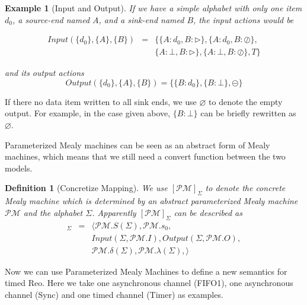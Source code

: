 \documentclass[conference, a4paper]{IEEEtran}
\newtheorem{definition}{Definition}
\newtheorem{example}{Example}
\newcommand{\rblock}[0]{\circleddash}
\newcommand{\rread}[0]{\rhd}
\newcommand{\rnoread}[0]{\oslash}
\newcommand{\smap}[1]{[{#1}]}
\begin{document}
\begin{example}[Input and Output]
  If we have a simple alphabet with only one item $d_0$, a source-end named $A$, and a
  sink-end named $B$, the input actions would be
  \begin{small}
    \begin{eqnarray*}
      Input(\{d_0\},\{A\},\{B\}) &=& \{\{A:d_0,B:\rread\},\{A:d_0,B:\rnoread\}, \\
      & & \{A:\bot,B:\rread\},\{A:\bot,B:\rnoread\},T\}
    \end{eqnarray*}
  \end{small}
  and its output actions
  \[
  Output(\{d_0\},\{A\},\{B\}) =\{\{B:d_0\},\{B:\bot\}, \rblock\}
  \]
\end{example}

If there no data item written to all sink ends, we use $\varnothing$ to denote the empty output. For
example, in the case given above, $\{B:\bot\}$ can be briefly rewritten as $\varnothing$.

Parameterized Mealy machines can be seen as an abstract form of Mealy machines, which means that we
still need a convert function between the two models.

\begin{definition}[Concretize Mapping]
  We use $\smap{\mathcal{PM}}_{\Sigma}$ to denote the concrete Mealy machine which is determined by
  an abstract parameterized Mealy machine $\mathcal{PM}$ and the alphabet $\Sigma$. Apparently
  $\smap{\mathcal{PM}}_{\Sigma}$ can be described as
  \begin{eqnarray*}
    \smap{\mathcal{PM}}_{\Sigma} &=& 
    \langle
    \mathcal{PM}.S(\Sigma), \mathcal{PM}.s_0, \\
    & & Input(\Sigma, \mathcal{PM}.I), Output(\Sigma, \mathcal{PM}.O), \\
    & & \mathcal{PM}.\delta(\Sigma), \mathcal{PM}.\lambda(\Sigma),
    \rangle
  \end{eqnarray*}
\end{definition}

Now we can use Parameterized Mealy Machines to define a new semantics for timed Reo. Here we
take one asynchronous channel (FIFO1), one asynchronous channel (Sync) and one timed channel (Timer)
as examples.
\end{document}
